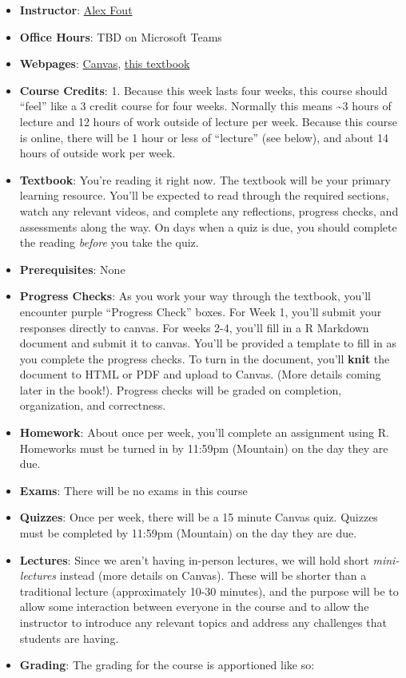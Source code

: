 \documentclass[
]{article}
\begin{document}
\begin{itemize}
\item
  \textbf{Instructor}: \href{mailto:fout@colostate.edu}{Alex Fout}
\item
  \textbf{Office Hours}: TBD on Microsoft Teams
\item
  \textbf{Webpages}: \href{https://canvas.colostate.edu}{Canvas}, \href{https://csu-r.github.io/Module1/}{this textbook}
\item
  \textbf{Course Credits}: 1. Because this week lasts four weeks, this course should ``feel'' like a 3 credit course for four weeks. Normally this means \textasciitilde3 hours of lecture and 12 hours of work outside of lecture per week. Because this course is online, there will be 1 hour or less of ``lecture'' (see below), and about 14 hours of outside work per week.
\item
  \textbf{Textbook}: You're reading it right now. The textbook will be your primary learning resource. You'll be expected to read through the required sections, watch any relevant videos, and complete any reflections, progress checks, and assessments along the way. On days when a quiz is due, you should complete the reading \emph{before} you take the quiz.
\item
  \textbf{Prerequisites}: None
\item
  \textbf{Progress Checks}: As you work your way through the textbook, you'll encounter purple ``Progress Check'' boxes. For Week 1, you'll submit your responses directly to canvas. For weeks 2-4, you'll fill in a R Markdown document and submit it to canvas. You'll be provided a template to fill in as you complete the progress checks. To turn in the document, you'll \textbf{knit} the document to HTML or PDF and upload to Canvas. (More details coming later in the book!). Progress checks will be graded on completion, organization, and correctness.
\item
  \textbf{Homework}: About once per week, you'll complete an assignment using R. Homeworks must be turned in by 11:59pm (Mountain) on the day they are due.
\item
  \textbf{Exams}: There will be no exams in this course
\item
  \textbf{Quizzes}: Once per week, there will be a 15 minute Canvas quiz. Quizzes must be completed by 11:59pm (Mountain) on the day they are due.
\item
  \textbf{Lectures}: Since we aren't having in-person lectures, we will hold short \emph{mini-lectures} instead (more details on Canvas). These will be shorter than a traditional lecture (approximately 10-30 minutes), and the purpose will be to allow some interaction between everyone in the course and to allow the instructor to introduce any relevant topics and address any challenges that students are having.
\item
  \textbf{Grading}: The grading for the course is apportioned like so:


\end{itemize}
\end{document}
